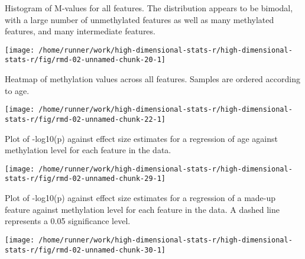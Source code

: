 \documentclass[ignorenonframetext,]{beamer}
\begin{document}
\begin{frame}{Histogram of M-values for all features. The distribution
appears to be bimodal, with a large number of unmethylated features as
well as many methylated features, and many intermediate features.}
\protect\hypertarget{histogram-of-m-values-for-all-features.-the-distribution-appears-to-be-bimodal-with-a-large-number-of-unmethylated-features-as-well-as-many-methylated-features-and-many-intermediate-features.}{}

\texttt{[image: /home/runner/work/high-dimensional-stats-r/high-dimensional-stats-r/fig/rmd-02-unnamed-chunk-20-1]}



\end{frame}

\begin{frame}{Heatmap of methylation values across all features. Samples
are ordered according to age.}
\protect\hypertarget{heatmap-of-methylation-values-across-all-features.-samples-are-ordered-according-to-age.}{}

\texttt{[image: /home/runner/work/high-dimensional-stats-r/high-dimensional-stats-r/fig/rmd-02-unnamed-chunk-22-1]}



\end{frame}

\begin{frame}{Plot of -log10(p) against effect size estimates for a
regression of age against methylation level for each feature in the
data.}
\protect\hypertarget{plot-of--log10p-against-effect-size-estimates-for-a-regression-of-age-against-methylation-level-for-each-feature-in-the-data.}{}

\texttt{[image: /home/runner/work/high-dimensional-stats-r/high-dimensional-stats-r/fig/rmd-02-unnamed-chunk-29-1]}



\end{frame}

\begin{frame}{Plot of -log10(p) against effect size estimates for a
regression of a made-up feature against methylation level for each
feature in the data. A dashed line represents a 0.05 significance
level.}
\protect\hypertarget{plot-of--log10p-against-effect-size-estimates-for-a-regression-of-a-made-up-feature-against-methylation-level-for-each-feature-in-the-data.-a-dashed-line-represents-a-0.05-significance-level.}{}

\texttt{[image: /home/runner/work/high-dimensional-stats-r/high-dimensional-stats-r/fig/rmd-02-unnamed-chunk-30-1]}



\end{frame}
\end{document}
